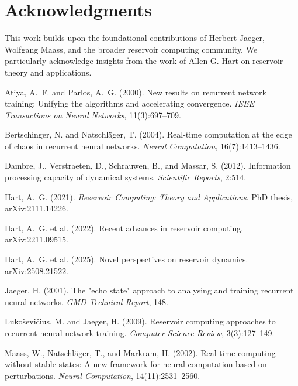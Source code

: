 \documentclass{article}
\begin{document}
\section*{Acknowledgments}

This work builds upon the foundational contributions of Herbert Jaeger, Wolfgang Maass, and the broader reservoir computing community. We particularly acknowledge insights from the work of Allen G. Hart on reservoir theory and applications.


\begin{thebibliography}{10}

Atiya, A.~F. and Parlos, A.~G. (2000).
\newblock New results on recurrent network training: Unifying the algorithms and accelerating convergence.
\newblock \emph{IEEE Transactions on Neural Networks}, 11(3):697--709.

Bertschinger, N. and Natschläger, T. (2004).
\newblock Real-time computation at the edge of chaos in recurrent neural networks.
\newblock \emph{Neural Computation}, 16(7):1413--1436.

Dambre, J., Verstraeten, D., Schrauwen, B., and Massar, S. (2012).
\newblock Information processing capacity of dynamical systems.
\newblock \emph{Scientific Reports}, 2:514.

Hart, A.~G. (2021).
\newblock \emph{Reservoir Computing: Theory and Applications}.
\newblock PhD thesis, arXiv:2111.14226.

Hart, A.~G. et al. (2022).
\newblock Recent advances in reservoir computing.
\newblock arXiv:2211.09515.

Hart, A.~G. et al. (2025).
\newblock Novel perspectives on reservoir dynamics.
\newblock arXiv:2508.21522.

Jaeger, H. (2001).
\newblock The "echo state" approach to analysing and training recurrent neural networks.
\newblock \emph{GMD Technical Report}, 148.

Lukoševičius, M. and Jaeger, H. (2009).
\newblock Reservoir computing approaches to recurrent neural network training.
\newblock \emph{Computer Science Review}, 3(3):127--149.

Maass, W., Natschl{\"a}ger, T., and Markram, H. (2002).
\newblock Real-time computing without stable states: A new framework for neural computation based on perturbations.
\newblock \emph{Neural Computation}, 14(11):2531--2560.


\end{thebibliography}
\end{document}
